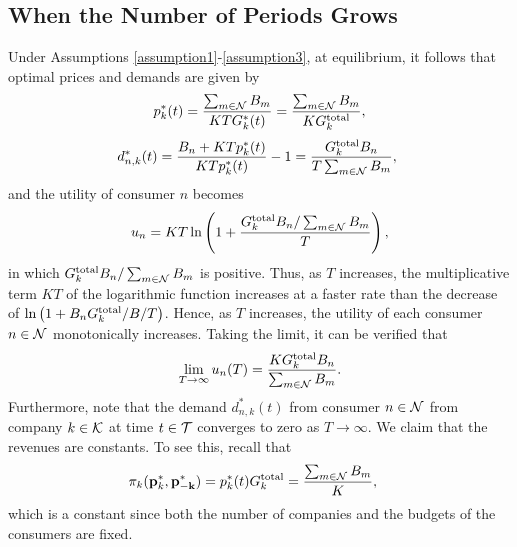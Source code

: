 \subsection{When the Number of Periods Grows} Under Assumptions \ref{assumption1}-\ref{assumption3}, at equilibrium, it follows that 
optimal prices and demands are given by 
\begin{equation} p^*_k(t)=\frac{\sum_{m\in {\cal N}}B_m}{KTG^*_k(t)}=\frac{\sum_{m\in {\cal N}}B_m}{KG^{{\rm total}}_k}, \label{ppp} \end{equation}
\begin{equation}d^*_{n,k}(t)=\frac{B_n+KTp^*_k(t)}{KTp^*_k(t)}-1=\frac{G^{{\rm total}}_kB_n}{T\sum_{m\in {\cal N}}B_m},\,\, \label{t1} \end{equation}
and the utility of consumer $n$ becomes\begin{equation} u_n=KT\ln\left(1+\frac{G^{{\rm total}}_kB_n/\sum_{m\in {\cal N}}B_m}{T}\right),\end{equation}
in which $G^{{\rm total}}_kB_n/\sum_{m\in {\cal N}}B_m$ is positive. Thus, as $T$ increases, the multiplicative term $ KT$ of the logarithmic function increases at a faster rate than the decrease of 
$\ln\left(1+{B_nG^{{\rm total}}_k/B}/{T}\right)$. 
Hence, as $T$ increases, the utility of each consumer $n \in {\cal N}$ monotonically increases.
Taking the limit, it can be verified that 
\begin{equation}\lim_{T\rightarrow\infty} u_n(T)=\frac{KG^{{\rm total}}_kB_n}{\sum_{m\in {\cal N}}B_m}.\end{equation}
Furthermore, note that the demand $d^*_{n,k}(t)$ from consumer $n\in {\cal N}$ from company $k\in {\cal K}$ at time $t\in {\cal T}$ converges to zero as $T \rightarrow \infty$. We claim that the revenues are constants. To see this, recall that
\begin{align*}
\pi_k({\bf{p}}^*_k,{\bf{p}^*_{-k}}) &= p^*_k(t)G^{{\rm total}}_k = \frac{\sum_{m\in {\cal N}}B_m}{K},
\end{align*}
which is a constant since both the number of companies and the budgets of the consumers are fixed.

